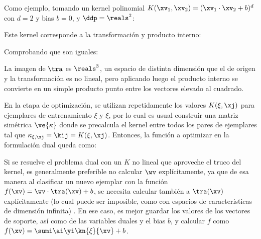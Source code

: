 
Como ejemplo, tomando un kernel polinomial $
K(\xv_1,\xv_2)=(\xv_1 \cdot \xv_2+b)^d $ con $d=2$ y bias $b=0$, y $\ddp = \reals^2$:


Este kernel corresponde a la transformación y producto interno:


Comprobando que son iguales:


La imagen de $\tra$ es $\reals^3$, un espacio de distinta dimensión que el de origen y la transformación es no lineal, pero aplicando luego el producto interno se convierte en un simple producto punto entre los vectores elevado al cuadrado. 

En la etapa de optimización, se utilizan repetidamente los valores $K(\xi,\xj)$ para ejemplares de entrenamiento $\xi$ y $\xi$, por lo cual es usual construir una matriz simétrica $\ve{\kappa}$ donde se precalcula el kernel entre todos los pares de ejemplares tal que $\kappa_{\xi,\xj}=\kij= K(\xi,\xj)$. Entonces, la función a optimizar en la formulación dual queda como:



Si se resuelve el problema dual con un $K$ no lineal que aproveche el truco del kernel, es generalmente preferible no calcular $\wv$ explícitamente, ya que de esa manera al clasificar un nuevo ejemplar con la función $f(\xv)=\wv \cdot \tra(\xv) +b$, se necesita calcular también a $\tra(\xv)$ explícitamente (lo cual puede ser imposible, como con espacios de características de dimensión infinita) . En ese caso, es mejor guardar los valores de los vectores de soporte, así como de las variables duales y el bias $b$, y calcular $f$ como $f(\xv)=   \sumi \ai \yi \kn{\xi}{\xv} +b$.


